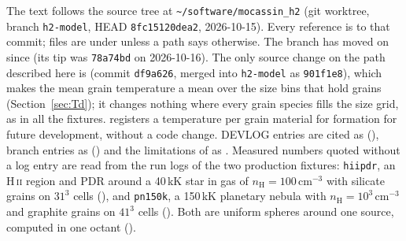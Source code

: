 The text follows the source tree at \texttt{\textasciitilde/software/mocassin\_h2}
(git worktree, branch \texttt{h2-model}, HEAD
\texttt{8fc15120dea2}, 2026-10-15). Every  reference is to that
commit; files are under  unless a path says otherwise. The
branch has moved on since (its tip was \texttt{78a74bd} on 2026-10-16). The only
source change on the path described here is  (commit \texttt{df9a626},
merged into \texttt{h2-model} as \texttt{901f1e8}), which makes the mean grain
temperature a mean over the size bins that hold grains
(Section~\ref{sec:Td}); it changes nothing where every grain species fills the
size grid, as in all the fixtures.  registers a temperature per
grain material for \Htwo{} formation for future development, without a code
change. DEVLOG
entries are cited as  (), branch entries as
 () and the limitations of
 as . Measured numbers quoted without a
log entry are read from the run logs of the two production fixtures:
\texttt{hiipdr}, an H\,\textsc{ii} region and PDR around a 40\,kK star in gas of
$n_{\mathrm H}=100$\,cm$^{-3}$ with silicate grains on $31^3$ cells
(), and \texttt{pn150k}, a 150\,kK planetary
nebula with $n_{\mathrm H}=10^3$\,cm$^{-3}$ and graphite grains on $41^3$ cells
(). Both are uniform spheres around one
source, computed in one octant ().

